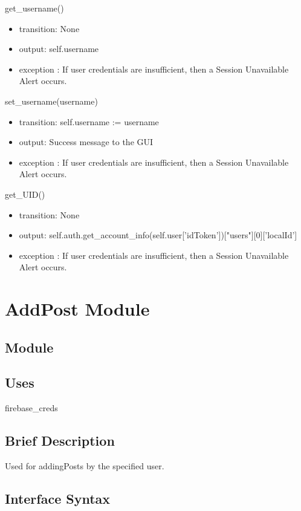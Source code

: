 \documentclass[12pt, titlepage]{article}
\begin{document}
 get\_username()
 \begin{itemize}
    \item transition: None
    \item output: self.username
    \item exception : If user credentials are insufficient, then a Session Unavailable Alert occurs.
\end{itemize}

 set\_username(username)
 \begin{itemize}
    \item transition: self.username := username
    \item output: Success message to the GUI
    \item exception : If user credentials are insufficient, then a Session Unavailable Alert occurs.
\end{itemize}

 get\_UID() 
\begin{itemize}
    \item transition: None
    \item output: self.auth.get\_account\_info(self.user['idToken'])["users"][0]['localId']
    \item exception : If user credentials are insufficient, then a Session Unavailable Alert occurs.
\end{itemize}








\newpage
\section* {AddPost Module}

\subsection*{Module}

\subsection* {Uses}
firebase\_creds

\subsection* {Brief Description}
Used for addingPosts by the specified user.

\subsection* {Interface Syntax}
\end{document}

